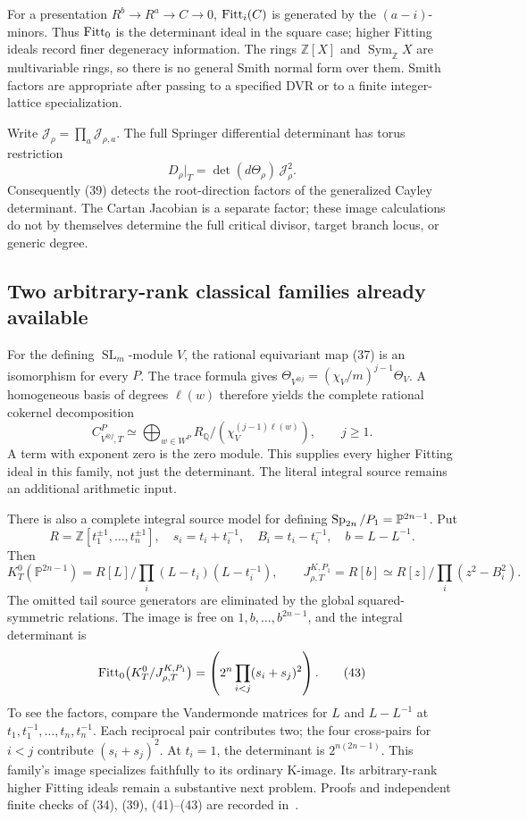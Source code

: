 \documentclass[11pt,letterpaper]{article}
\newcommand{\Z}{\mathbb Z}\newcommand{\Q}{\mathbb Q}\newcommand{\C}{\mathbb C}
\newcommand{\Sym}{\operatorname{Sym}}\newcommand{\Rep}{\operatorname{Rep}}
\newcommand{\SL}{\operatorname{SL}}\newcommand{\GL}{\operatorname{GL}}
\theoremstyle{definition}\newtheorem{definition}[theorem]{Definition}
\begin{document}
For a presentation \(R^b\to R^a\to C\to0\),
\(\operatorname{Fitt}_i(C)\) is generated by the \((a-i)\)-minors.
Thus \(\operatorname{Fitt}_0\) is the determinant ideal in the square case;
higher Fitting ideals record finer degeneracy information.
The rings \(\Z[X]\) and \(\Sym_\Z X\) are multivariable rings, so
there is no general Smith normal form over them.
Smith factors are appropriate after passing to a specified DVR
or to a finite integer-lattice specialization.

Write \(\mathcal J_\rho=\prod_a\mathcal J_{\rho,a}\).
The full Springer differential determinant has torus restriction
\[
 D_\rho|_T=\det(d\Theta_\rho)\,\mathcal J_\rho^2.
 \tag{40}
\]
Consequently (39) detects the root-direction factors of the generalized
Cayley determinant. The Cartan Jacobian is a separate factor; these
image calculations do not by themselves determine the full critical
divisor, target branch locus, or generic degree.

\subsection{Two arbitrary-rank classical families already available}
For the defining \(\SL_m\)-module \(V\), the rational equivariant map
(37) is an isomorphism for every \(P\).
The trace formula gives
\(\Theta_{V^{\otimes j}}=(\chi_V/m)^{j-1}\Theta_V\).
A homogeneous basis of degrees \(\ell(w)\) therefore yields
the complete rational cokernel decomposition
\[
 C_{V^{\otimes j},T}^P
 \simeq\bigoplus_{w\in W^P}
       R_\Q/(\chi_V^{(j-1)\ell(w)}),\qquad j\ge1.
 \tag{41}
\]
A term with exponent zero is the zero module.
This supplies every higher Fitting ideal in this family, not just
the determinant. The literal integral source remains an additional
arithmetic input.

There is also a complete integral source model for defining
\(\operatorname{Sp}_{2n}/P_1=\mathbb P^{2n-1}\).
Put
\[
 R=\Z[t_1^{\pm1},\ldots,t_n^{\pm1}],\quad
 s_i=t_i+t_i^{-1},\quad B_i=t_i-t_i^{-1},\quad b=L-L^{-1}.
\]
Then
\[
 K_T^0(\mathbb P^{2n-1})
 =R[L]/\prod_i(L-t_i)(L-t_i^{-1}),\qquad
 J_{\rho,T}^{K,P_1}=R[b]
 \simeq R[z]/\prod_i(z^2-B_i^2).
 \tag{42}
\]
The omitted tail source generators are eliminated by the global
squared-symmetric relations. The image is free on
\(1,b,\ldots,b^{2n-1}\), and the integral determinant is
\[
 \operatorname{Fitt}_0\bigl(K_T^0/J_{\rho,T}^{K,P_1}\bigr)
   =\left(2^n\prod_{i<j}(s_i+s_j)^2\right).
 \tag{43}
\]
To see the factors, compare the Vandermonde matrices for
\(L\) and \(L-L^{-1}\) at
\(t_1,t_1^{-1},\ldots,t_n,t_n^{-1}\).
Each reciprocal pair contributes two; the four cross-pairs
for \(i<j\) contribute \((s_i+s_j)^2\).
At \(t_i=1\), the determinant is \(2^{n(2n-1)}\).
This family's image specializes faithfully to its ordinary K-image.
Its arbitrary-rank higher Fitting ideals remain a substantive next
problem. Proofs and independent finite checks of (34), (39),
(41)--(43) are recorded in~\cite{Exploration}.
\end{document}
